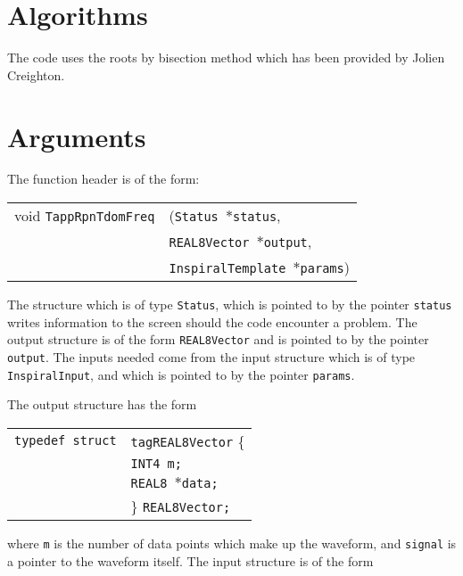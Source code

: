 \documentclass[12pt]{article}
\begin{document}
\section{Algorithms}

The code uses the roots by bisection method which has been provided by Jolien Creighton.

\section{Arguments}


The function header is of the form:

\vspace{5mm}

\begin{tabular}{ll}
void \texttt{TappRpnTdomFreq}&(\texttt{Status $\ast$status},     \\
                                   &\texttt{REAL8Vector $\ast$output}, \\
                                   &\texttt{InspiralTemplate $\ast$params})
\end{tabular}

\vspace{5mm}

The structure which is of type \texttt{Status}, which is pointed to by the pointer \texttt{status} writes information to the screen should the code encounter
a problem. The output structure is of the form \texttt{REAL8Vector} and is pointed to by the pointer \texttt{output}.
The inputs needed come from the input structure which is of type \texttt{InspiralInput}, and which is pointed to by the pointer \texttt{params}.

The output structure has the form

\vspace{5mm}

\begin{tabular}{ll}
\texttt{typedef struct} & \texttt{tagREAL8Vector} \{ \\
                        & \texttt{INT4 m;} \\
                        & \texttt{REAL8 $\ast$data;}  \\
                        & \} \texttt{REAL8Vector;}
\end{tabular}

\vspace{5mm}

where \texttt{m} is the number of data points which make up the waveform, and \texttt{signal} is a pointer to the waveform itself. The input structure is of the form
\end{document}

